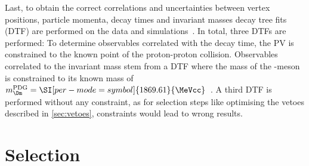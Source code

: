 Last, to obtain the correct correlations and uncertainties between vertex positions, particle momenta, decay times and invariant masses decay tree fits (DTF) are performed on the data and simulations~\cite{2005NIMPA}.
In total, three DTFs are performed: To determine observables correlated with the decay time, the \ac{PV} is constrained to the known point of the proton-proton collision.
Observables correlated to the invariant mass stem from a DTF where the mass of the \Dm-meson is constrained to its known mass of $m_\Dm^{\text{PDG}}=\SI[per-mode=symbol]{1869.61}{\MeVcc}$~\cite{PDG_2017}.
A third DTF is performed without any constraint, as for selection steps like optimising the vetoes described in \cref{sec:vetoes}, constraints would lead to wrong results.

\section{Selection}
\label{sec:selection}

